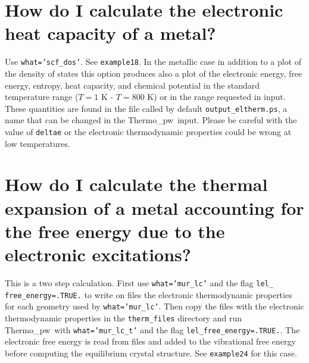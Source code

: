 \documentclass[12pt,a4paper,twoside]{report}
\def\thermo{{\sc Thermo}\_{\sc pw}}
\begin{document}
\newpage
{\color{coral}\section{How do I calculate the electronic heat capacity
of a metal?}}
\color{black}
Use \texttt{what='scf\_dos'}. See \texttt{example18}. In the metallic
case in addition to a plot of the density of states this option produces
also a plot of the electronic energy, free energy, entropy, heat capacity,
and chemical potential in the standard temperature range 
($T=1$ K - $T=800$ K) or in the range requested in input.
These quantities are found in the file called by default
\texttt{output\_eltherm.ps}, a name that can be changed in the \thermo\ input.
Please be careful with the value of \texttt{deltae} or the electronic
thermodynamic properties could be wrong at low temperatures.

\newpage
{\color{coral}\section{How do I calculate the thermal expansion of a metal
accounting for the free energy due to the electronic excitations?}}
\color{black}
This is a two step calculation. First use \texttt{what='mur\_lc'} and
the flag \texttt{lel\_} \texttt{free\_energy=.TRUE.} to write on files the
electronic thermodynamic properties for each geometry used by
\texttt{what='mur\_lc'}. Then copy the files with
the electronic thermodynamic properties in the  
\texttt{therm\_files} directory and run \thermo\ with \texttt{what='mur\_lc\_t'}
and the flag \texttt{lel\_free\_energy=.TRUE.}. The electronic free energy
is read from files and added to the vibrational free energy before computing
the equilibrium crystal structure.
See \texttt{example24} for this case. 
\end{document}
